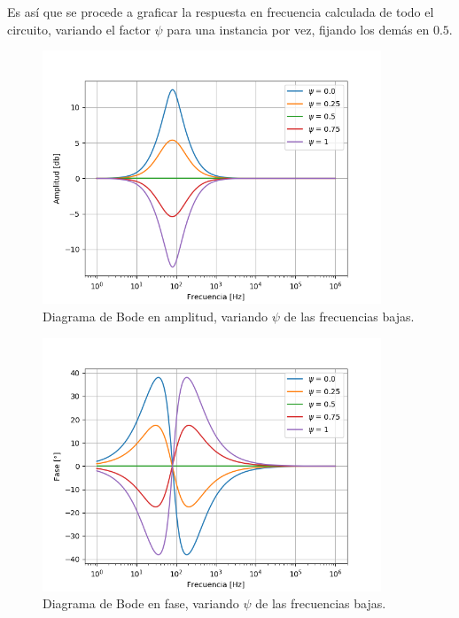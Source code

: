 \documentclass[a4paper]{article}
\begin{document}
Es así que se procede a graficar la respuesta en frecuencia calculada de todo el circuito, variando el factor $\psi$ para una instancia por vez, fijando los demás en $0.5$.
\begin{figure}[H]
\centering
	\includegraphics[width=0.9\textwidth]{Imagenes/Low-psi-bode.png}
	\caption{Diagrama de Bode en amplitud, variando $\psi$ de las frecuencias bajas.}
	\label{fig:bode_modulo_low}
\end{figure}
\begin{figure}[H]
\centering
	\includegraphics[width=0.9\textwidth]{Imagenes/Low-psi-ph.png}
	\caption{Diagrama de Bode en fase, variando $\psi$ de las frecuencias bajas.}
	\label{fig:bode_ph_low}
\end{figure}
\end{document}
